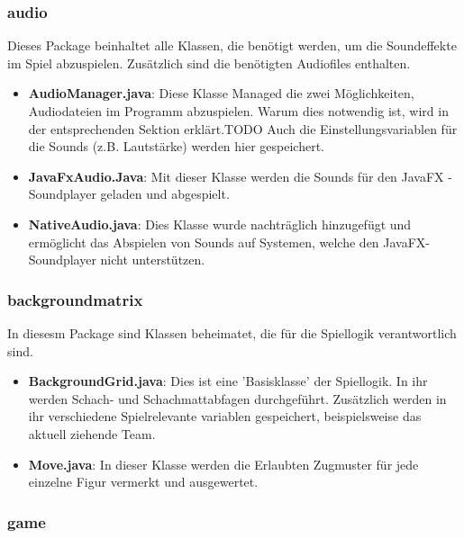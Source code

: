 \documentclass[12pt,a4paper]{article}
\begin{document}
{\subsubsection{audio}

Dieses Package beinhaltet alle Klassen, die benötigt werden, um die Soundeffekte im Spiel abzuspielen. Zusätzlich sind die benötigten Audiofiles enthalten.\

\begin{itemize}
	\item{\textbf{AudioManager.java}: Diese Klasse Managed die zwei Möglichkeiten, Audiodateien im Programm abzuspielen. Warum dies notwendig ist, wird in der entsprechenden Sektion erklärt.TODO Auch die Einstellungsvariablen für die Sounds (z.B. Lautstärke) werden hier gespeichert. }
	
	\item{\textbf{JavaFxAudio.Java}: Mit dieser Klasse werden die Sounds für den JavaFX - Soundplayer geladen und abgespielt. }	
	
	\item{\textbf{NativeAudio.java}: Dies Klasse wurde nachträglich hinzugefügt und ermöglicht das Abspielen von Sounds auf Systemen, welche den JavaFX-Soundplayer nicht unterstützen.}
	
\end{itemize}

\subsubsection{backgroundmatrix}

In diesesm Package sind Klassen beheimatet, die für die Spiellogik verantwortlich sind.

\begin{itemize}
	\item{\textbf{BackgroundGrid.java}: Dies ist eine 'Basisklasse' der Spiellogik. In ihr werden Schach- und Schachmattabfagen durchgeführt. Zusätzlich werden in ihr verschiedene Spielrelevante variablen gespeichert, beispielsweise das aktuell ziehende Team.}
	
	\item{\textbf{Move.java}: In dieser Klasse werden die Erlaubten Zugmuster für jede einzelne Figur vermerkt und ausgewertet.  }

\end{itemize}
 
\subsubsection{game}

}
\end{document}
